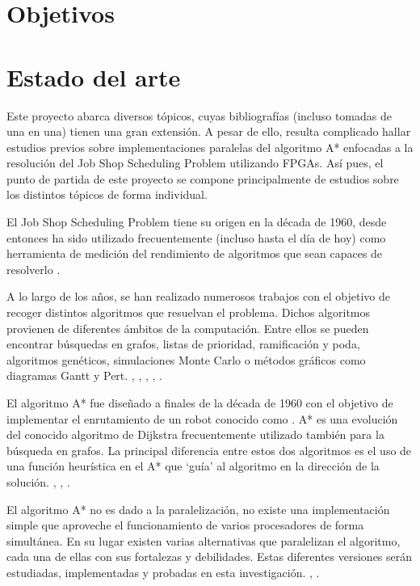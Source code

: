 
\section{Objetivos}

\section{Estado del arte}

Este proyecto abarca diversos tópicos, cuyas bibliografías
(incluso tomadas de una en una) tienen una gran extensión.
A pesar de ello, resulta complicado hallar estudios previos sobre implementaciones
paralelas del algoritmo A* enfocadas a la resolución del Job Shop Scheduling Problem
utilizando FPGAs.
Así pues, el punto de partida de este proyecto
se compone principalmente de estudios
sobre los distintos tópicos de forma individual.

El Job Shop Scheduling Problem tiene su origen en la década de 1960,
desde entonces ha sido utilizado frecuentemente (incluso hasta el día de hoy)
como herramienta de medición del rendimiento de algoritmos que sean 
capaces de resolverlo \cite{Man67}.

A lo largo de los años, se han realizado numerosos trabajos con el objetivo
de recoger distintos algoritmos que resuelvan el problema.
Dichos algoritmos provienen de diferentes ámbitos de la computación.
Entre ellos se pueden encontrar búsquedas en grafos,
listas de prioridad, ramificación y poda, algoritmos genéticos,
simulaciones Monte Carlo o
métodos gráficos como diagramas Gantt y Pert.
\cite{Yan77}, \cite{Nil69}, \cite{KTM99}, \cite{BC22}, \cite{Pin08}.

El algoritmo A* fue diseñado a finales de la década de 1960
con el objetivo de implementar el enrutamiento de un robot
conocido como  \cite{Nil84}.
A* es una evolución del conocido algoritmo de Dijkstra
frecuentemente utilizado también para la búsqueda en grafos.
La principal diferencia entre estos dos algoritmos es el
uso de una función heurística en el A* que `guía' al algoritmo
en la dirección de la solución.
\cite{HNR68}, \cite{MSV13}, \cite{Kon14}.

El algoritmo A* no es dado a la paralelización,
no existe una implementación simple que aproveche el funcionamiento de
varios procesadores de forma simultánea.
En su lugar existen varias alternativas que paralelizan el algoritmo,
cada una de ellas con sus fortalezas y debilidades.
Estas diferentes versiones serán estudiadas, implementadas y
probadas en esta investigación.
\cite{Zag17}, \cite{WH16}.

